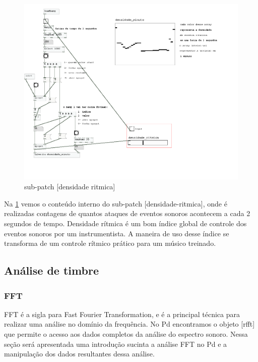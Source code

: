 \documentclass{ppgmus}
\begin{document}
\begin{figure}[!ht]
\includegraphics[scale=.75]{prot5c}
\caption{sub-patch [densidade ritmica]}
\label{prot5c}
\end{figure}


Na \ref{prot5c} vemos o conteúdo interno do sub-patch [densidade-ritmica], onde é realizadas
contagens de quantos ataques de eventos sonoros acontecem a cada 2 segundos de tempo.
Densidade rítmica é um bom índice global de controle dos eventos sonoros por um instrumentista.
A maneira de uso desse índice se transforma de um controle rítmico prático para um
músico treinado.





\subsection{Análise de timbre}

\subsubsection{FFT}

FFT é a sigla para Fast Fourier Transformation, e é a principal técnica para realizar uma análise no domínio 
da frequência. No Pd encontramos o objeto [rfft\texttildelow] que permite o 
acesso aos dados completos da análise do espectro sonoro.
Nessa seção será apresentada uma introdução sucinta a 
análise FFT no Pd e a manipulação dos dados resultantes dessa análise.
\end{document}
